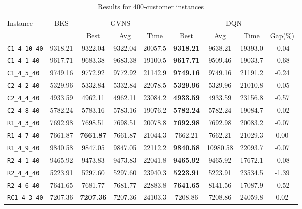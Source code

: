 \begin{table}[ht]
\centering
\small
\setlength{\tabcolsep}{5pt}
\caption{Results for 400-customer instances}
\vspace{4mm}
\begin{adjustbox}{width=\textwidth}
\begin{tabular}{l c c c c @{\hspace{8pt}} c c c c @{\hspace{8pt}}}
\toprule
\multirow{2}{*}{Instance} & \multirow{2}{*}{BKS} & \multicolumn{3}{c}{GVNS+} & \multicolumn{4}{c}{DQN} \\
\cmidrule(lr){3-5} \cmidrule(lr){6-9}
 &  & Best & Avg & Time & Best & Avg & Time & Gap(\%) \\
\midrule
\texttt{C1\_4\_10\_40} & 9318.21 & 9322.04 & 9322.04 & 20057.5 & \textbf{9318.21} & 9638.21 & 19393.0 & -0.04 \\
\texttt{C1\_4\_1\_40} & 9617.71 & 9683.38 & 9683.38 & 19100.5 & \textbf{9617.71} & 9509.46 & 19033.7 & -0.68 \\
\texttt{C1\_4\_5\_40} & 9749.16 & 9772.92 & 9772.92 & 21142.9 & \textbf{9749.16} & 9749.16 & 21191.2 & -0.24 \\
\texttt{C2\_4\_2\_40} & 5329.96 & 5332.84 & 5332.84 & 22078.5 & \textbf{5329.96} & 5329.96 & 21010.8 & -0.05 \\
\texttt{C2\_4\_4\_40} & 4933.59 & 4962.11 & 4962.11 & 23084.2 & \textbf{4933.59} & 4933.59 & 23156.8 & -0.57 \\
\texttt{C2\_4\_8\_40} & 5782.24 & 5783.16 & 5783.16 & 19076.2 & \textbf{5782.24} & 5782.24 & 19084.7 & -0.02 \\
\texttt{R1\_4\_3\_40} & 7692.98 & 7698.51 & 7698.51 & 20078.8 & \textbf{7692.98} & 7692.98 & 20083.2 & -0.07 \\
\texttt{R1\_4\_7\_40} & 7661.87 & \textbf{7661.87} & 7661.87 & 21044.3 & 7662.21 & 7662.21 & 21029.3 & 0.00 \\
\texttt{R1\_4\_9\_40} & 9840.58 & 9847.05 & 9847.05 & 22112.2 & \textbf{9840.58} & 10980.58 & 22093.7 & -0.07 \\
\texttt{R2\_4\_1\_40} & 9465.92 & 9473.83 & 9473.83 & 22041.8 & \textbf{9465.92} & 9465.92 & 17672.1 & -0.08 \\
\texttt{R2\_4\_4\_40} & 5223.91 & 5297.60 & 5297.60 & 23940.3 & \textbf{5223.91} & 5223.91 & 23534.5 & -1.39 \\
\texttt{R2\_4\_6\_40} & 7641.65 & 7681.77 & 7681.77 & 22883.8 & \textbf{7641.65} & 8141.56 & 17087.9 & -0.52 \\
\texttt{RC1\_4\_3\_40} & 7207.36 & \textbf{7207.36} & 7207.36 & 24103.3 & 7208.86 & 7208.86 & 24059.8 & 0.02 \\

\end{tabular}
\end{adjustbox}
\end{table}
